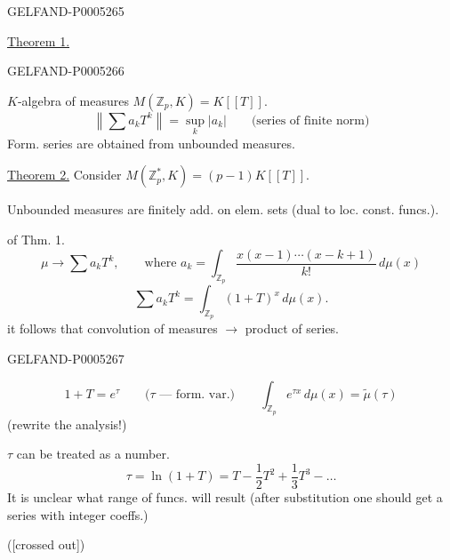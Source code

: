 \begin{GelfandAdjacentEvidence}{GELFAND-P000526}{5}


\uline{Theorem 1.}
\end{GelfandAdjacentEvidence}
\begin{GelfandAdjacentEvidence}{GELFAND-P000526}{6}

$K$-algebra of measures $M(\mathbb Z_p,K)=K[[T]]$.
\[
\left\|\sum a_kT^k\right\|=\sup_k|a_k|
\qquad\text{(series of finite norm)}
\]
Form. series are obtained from unbounded measures.

\uline{Theorem 2.} Consider $M(\mathbb Z_p^*,K)=(p-1)K[[T]]$.

Unbounded measures are finitely add. on elem. sets (dual to loc. const. funcs.).

 of Thm. 1.
\[
\mu\longrightarrow\sum a_kT^k,\qquad
\text{where }a_k=\int_{\mathbb Z_p}\frac{x(x-1)\cdots(x-k+1)}{k!}\,d\mu(x)
\]
\[
\sum a_kT^k=\int_{\mathbb Z_p}(1+T)^x\,d\mu(x).
\]
it follows that convolution of measures $\longrightarrow$ product of series.

\end{GelfandAdjacentEvidence}
\begin{GelfandAdjacentEvidence}{GELFAND-P000526}{7}

\[
1+T=e^\tau\qquad\text{($\tau$ — form. var.)}
\qquad\int_{\mathbb Z_p}e^{\tau x}\,d\mu(x)=\widetilde{\mu}(\tau)
\]
(rewrite the analysis!)

$\tau$ can be treated as a number.
\[
\tau=\ln(1+T)=T-\frac12T^2+\frac13T^3-\ldots
\]
It is unclear what range of funcs. will result (after substitution one should get a series with integer coeffs.)

([crossed out])
\end{GelfandAdjacentEvidence}
